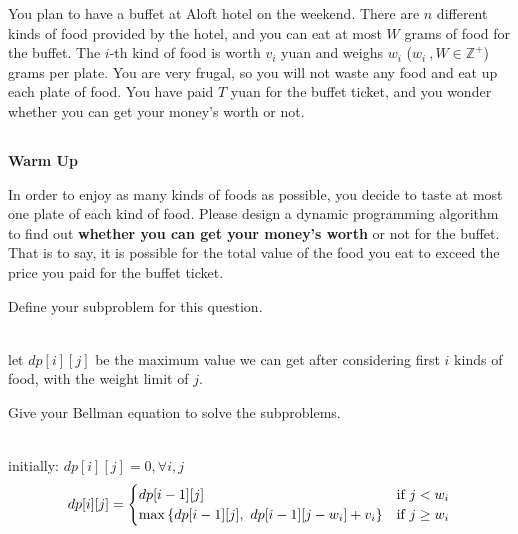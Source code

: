 
You plan to have a buffet at Aloft hotel on the weekend. There are $n$ different kinds of food provided by the hotel, and you can eat at most $W$ grams of food for the buffet. The $i$-th kind of food is worth $v_i$ yuan and weighs $w_i$ ($w_i\ ,W \in \mathbb{Z}^{+}$) grams per plate. You are very frugal, so you will not waste any food and eat up each plate of food. You have paid $T$ yuan for the buffet ticket, and you wonder whether you can get your money's worth or not.

\begin{parts}
	\part{} \textbf{Warm Up} \par
	In order to enjoy as many kinds of foods as possible, you decide to taste at most one plate of each kind of food. Please design a dynamic programming algorithm to find out \textbf{whether you can get your money's worth} or not for the buffet. That is to say, it is possible for the total value of the food you eat to exceed the price you paid for the buffet ticket.
	\begin{subparts}
		\subpart[2] Define your subproblem for this question.
		\begin{solution}
			\\let $dp[i][j]$ be the maximum value we can get after considering first $i$ kinds of food, with the weight limit of $j$.\\
		\end{solution}

		\subpart[4] Give your Bellman equation to solve the subproblems.
		\begin{solution}
			\\initially: $dp[i][j] = 0, \forall i,j$\\
			\[
				dp[i][j]=
				\begin{cases}
					dp[i-1][j]                      & \text{if}\ j<w_i \\
					\max\left\{dp[i-1][j],\ dp[i-1][j-w_i]+v_i\right\} & \text{if}\ j\geq w_i
				\end{cases}
			\]

\end{solution}
\end{subparts}
\end{parts}
